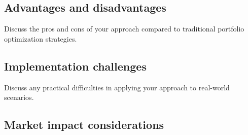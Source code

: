 \subsection{Advantages and disadvantages}
Discuss the pros and cons of your approach compared to traditional portfolio optimization strategies.
\subsection{Implementation challenges}
Discuss any practical difficulties in applying your approach to real-world scenarios.

\subsection{Market impact considerations}


